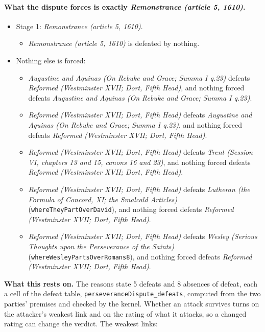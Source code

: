 \documentclass[11pt]{article}
\begin{document}
\paragraph{What the dispute forces is exactly \emph{Remonstrance (article 5, 1610)}.}
\begin{itemize}
\item Stage 1: \emph{Remonstrance (article 5, 1610)}.
\begin{itemize}
\item \emph{Remonstrance (article 5, 1610)} is defeated by nothing.
\end{itemize}
\item Nothing else is forced:
\begin{itemize}
\item \emph{Augustine and Aquinas (On Rebuke and Grace; Summa I q.23)} defeats \emph{Reformed (Westminster XVII; Dort, Fifth Head)}, and nothing forced defeats \emph{Augustine and Aquinas (On Rebuke and Grace; Summa I q.23)}.
\item \emph{Reformed (Westminster XVII; Dort, Fifth Head)} defeats \emph{Augustine and Aquinas (On Rebuke and Grace; Summa I q.23)}, and nothing forced defeats \emph{Reformed (Westminster XVII; Dort, Fifth Head)}.
\item \emph{Reformed (Westminster XVII; Dort, Fifth Head)} defeats \emph{Trent (Session VI, chapters 13 and 15, canons 16 and 23)}, and nothing forced defeats \emph{Reformed (Westminster XVII; Dort, Fifth Head)}.
\item \emph{Reformed (Westminster XVII; Dort, Fifth Head)} defeats \emph{Lutheran (the Formula of Concord, XI; the Smalcald Articles)} (\texttt{where\allowbreak{}They\allowbreak{}Part\allowbreak{}Over\allowbreak{}David}), and nothing forced defeats \emph{Reformed (Westminster XVII; Dort, Fifth Head)}.
\item \emph{Reformed (Westminster XVII; Dort, Fifth Head)} defeats \emph{Wesley (Serious Thoughts upon the Perseverance of the Saints)} (\texttt{where\allowbreak{}Wesley\allowbreak{}Parts\allowbreak{}Over\allowbreak{}Romans8}), and nothing forced defeats \emph{Reformed (Westminster XVII; Dort, Fifth Head)}.
\end{itemize}
\end{itemize}
\par\noindent\textbf{What this rests on.} The reasons state 5 defeats and 8 absences of defeat, each a cell of the defeat table, \texttt{perseverance\allowbreak{}Dispute\_\allowbreak{}defeats}, computed from the two parties' premises and checked by the kernel. Whether an attack survives turns on the attacker's weakest link and on the rating of what it attacks, so a changed rating can change the verdict. The weakest links:
\end{document}
